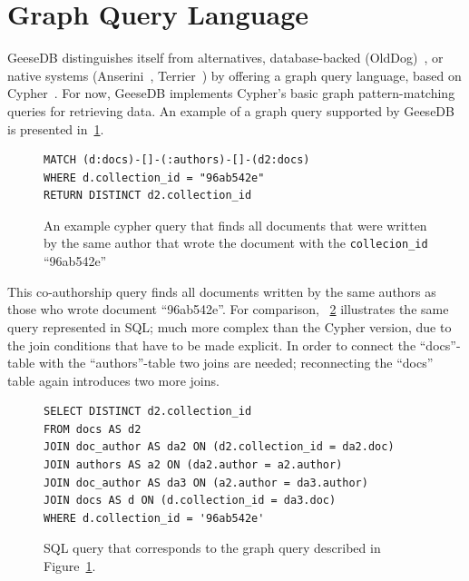 \section{Graph Query Language}
GeeseDB distinguishes itself from alternatives, database-backed (OldDog)~\citep{olddog-docker}, or native systems (Anserini~\citep{anserini}, Terrier~\citep{terrier}) by offering a graph query language, based on Cypher~\citep{cypher}. 
For now, GeeseDB implements Cypher's basic graph pattern-matching queries for retrieving data. An example of a graph query supported by GeeseDB is presented in~\cref{fig:graph_query}.
\begin{figure}
	\begin{verbatim}
MATCH (d:docs)-[]-(:authors)-[]-(d2:docs)
WHERE d.collection_id = "96ab542e"
RETURN DISTINCT d2.collection_id
	\end{verbatim}
	\caption{An example cypher query that finds all documents that were written by the same author that wrote the document with the \texttt{collecion\_id} ``96ab542e''}
	\label{fig:graph_query}
\end{figure}
This co-authorship query finds all documents written by the same authors as those who wrote document ``96ab542e''. For comparison, ~\cref{fig:corresponding_sql} illustrates the same query represented in SQL; much more complex than the Cypher version, due to the join conditions that have to be made explicit. In order to connect the ``docs''-table with the ``authors''-table two joins are needed; reconnecting the ``docs'' table again introduces two more joins.

\begin{figure}
	\begin{verbatim}
SELECT DISTINCT d2.collection_id
FROM docs AS d2
JOIN doc_author AS da2 ON (d2.collection_id = da2.doc)
JOIN authors AS a2 ON (da2.author = a2.author)
JOIN doc_author AS da3 ON (a2.author = da3.author)
JOIN docs AS d ON (d.collection_id = da3.doc)
WHERE d.collection_id = '96ab542e'
	\end{verbatim}
	\caption{SQL query that corresponds to the graph query described in Figure~\ref{fig:graph_query}.}
	\label{fig:corresponding_sql}
\end{figure}

